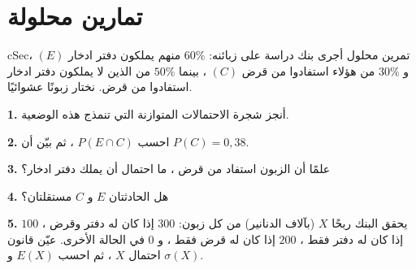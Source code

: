 \documentclass[12pt,a4paper]{article}
\newenvironment{BOX}[2]{\begin{otherlanguage}{english}\begin{arbox}{#1}{#2}}{\end{arbox}\end{otherlanguage}}
\newcounter{exo}
\newcommand{\QQ}[1]{\par\smallskip\textbf{#1.} }
\newenvironment{tmr}{\stepcounter{exo}\begin{BOX}{cSec}{تمرين محلول \theexo}}{\end{BOX}}
\begin{document}
\section{تمارين محلولة}
\begin{tmr}
أجرى بنك دراسة على زبائنه: $60\%$ منهم يملكون دفتر ادخار $(E)$ ، و $30\%$ من هؤلاء استفادوا من قرض $(C)$ ، بينما $50\%$ من الذين لا يملكون دفتر ادخار استفادوا من قرض. نختار زبونًا عشوائيًا.
\QQ{1} أنجز شجرة الاحتمالات المتوازنة التي تنمذج هذه الوضعية.
\QQ{2} احسب $P(E\cap C)$ ، ثم بيّن أن $P(C)=0{,}38$.
\QQ{3} علمًا أن الزبون استفاد من قرض ، ما احتمال أن يملك دفتر ادخار؟
\QQ{4} هل الحادثتان $E$ و $C$ مستقلتان؟
\QQ{5} يحقق البنك ربحًا $X$ (بآلاف الدنانير) من كل زبون: $300$ إذا كان له دفتر وقرض ، $100$ إذا كان له دفتر فقط ، $200$ إذا كان له قرض فقط ، و $0$ في الحالة الأخرى. عيّن قانون احتمال $X$ ، ثم احسب $E(X)$ و $\sigma(X)$.
\end{tmr}
\end{document}
